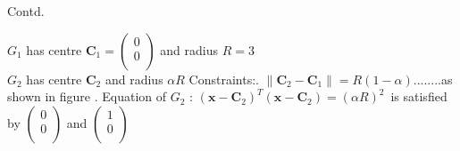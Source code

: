 \documentclass[10pt]{beamer}
\begin{document}
\begin{frame}{Contd.}

\(G_1\) has centre \(\textbf{C}_1 = \left( {\begin{array}{c}
   0 \\
   0 \\
   \end{array} } \right)\) and radius \(R = 3\) \newline
   \\

\(G_2\) has centre \(\textbf{C}_2\) and radius \(\alpha R\)\newline \newline
Constraints:\newline {}. \(\|\textbf{C}_2-\textbf{C}_1 \|= R(1-\alpha)\)........as shown in figure \newline {}. Equation of \(G_2\) : \((\textbf{x}-\textbf{C}_2)^{T}(\textbf{x}-\textbf{C}_2) = (\alpha R)^2\)\ \newline \newline is satisfied by \( \left( {\begin{array}{c}
   0 \\
   0 \\
   \end{array} } \right)\) and \( \left( {\begin{array}{c}
   1 \\
   0 \\
   \end{array} } \right)\)
  
\end{frame}
\end{document}
